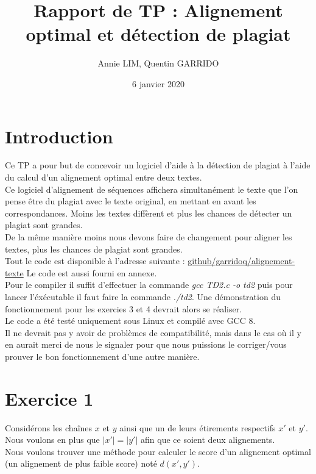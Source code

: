 \documentclass{article}
\title{Rapport de TP : Alignement optimal et détection de plagiat}
\author{Annie LIM, Quentin GARRIDO}
\date{6 janvier 2020}
\begin{document}
\maketitle
\tableofcontents
\pagebreak

\section{Introduction}

Ce TP a pour but de concevoir un logiciel d'aide à la détection de plagiat à
l'aide du calcul d'un alignement optimal entre deux textes.\\
Ce logiciel d'alignement de séquences affichera simultanément le texte que l'on
pense être du plagiat avec le texte original, en mettant en avant les correspondances.
Moins les textes diffèrent et plus les chances de détecter un plagiat sont
grandes.\\
De la même manière moins nous devons faire de changement pour aligner les
textes, plus les chances de plagiat sont grandes.\\

Tout le code est disponible à l'adresse suivante :
\href{https://github.com/garridoq/alignement-texte}{github/garridoq/alignement-texte}
Le code est aussi fourni en annexe.\\

Pour le compiler il suffit d'effectuer la commande \textit{gcc TD2.c -o td2}
puis pour lancer l'éxécutable il faut faire la commande \textit{./td2}.
Une démonstration du fonctionnement pour les exercies 3 et 4 devrait alors se
réaliser.\\

Le code a été testé uniquement sous Linux et compilé avec GCC 8.\\
Il ne devrait pas y avoir de problèmes de compatibilité, mais dans le cas où il
y en aurait merci de nous le signaler pour que nous puissions le corriger/vous
prouver le bon fonctionnement d'une autre manière. 

\section{Exercice 1}

Considérons les chaînes $x$ et $y$ ainsi que un de leurs étirements respectifs $x'$
et $y'$. Nous voulons en plus que $ \lvert x' \rvert = \lvert y' \rvert $ afin
que ce soient deux alignements.\\
Nous voulons trouver une méthode pour calculer le score d'un alignement optimal
(un alignement de plus faible score) noté $d(x',y')$.\\
\end{document}
